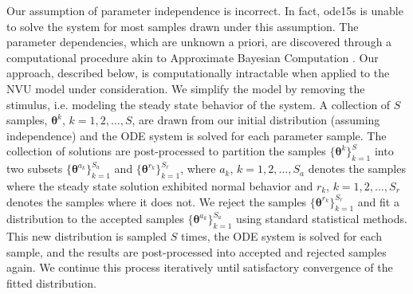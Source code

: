 Our assumption of parameter independence is incorrect. In fact, ode15s is unable to solve the system for most samples drawn under this assumption. The parameter dependencies, which are unknown a priori, are discovered through a computational procedure akin to Approximate Bayesian Computation \cite{abc}. Our approach, described below, is computationally intractable when applied to the NVU model under consideration. We simplify the model by removing the stimulus, i.e. modeling the steady state behavior of the system. A collection of $S$ samples, $\boldsymbol{\theta}^k$, $k=1,2,\dots,S$, are drawn from our initial distribution (assuming independence) and the ODE system is solved for each parameter sample. The collection of solutions are post-processed to partition the samples $\{\boldsymbol{\theta}^k\}_{k=1}^S$ into two subsets $\{\boldsymbol{\theta}^{a_k}\}_{k=1}^{S_a}$ and $\{\boldsymbol{\theta}^{r_k}\}_{k=1}^{S_r}$, where $a_k$, $k=1,2,\dots,S_a$ denotes the samples where the steady state solution exhibited normal behavior and $r_k$, $k=1,2,\dots,S_r$ denotes the samples where it does not. We reject the samples $\{\boldsymbol{\theta}^{r_k}\}_{k=1}^{S_r}$ and fit a distribution to the accepted samples $\{\boldsymbol{\theta}^{a_k}\}_{k=1}^{S_a}$ using standard statistical methods. This new distribution is sampled $S$ times,  the ODE system is solved for each sample, and the results are post-processed into accepted and rejected samples again. We continue this process iteratively until satisfactory convergence of the fitted distribution.

